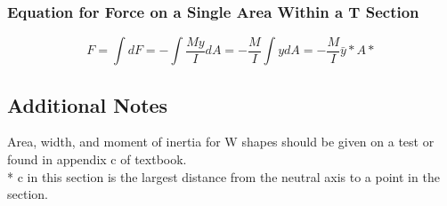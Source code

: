 \documentclass[10pt,landscape]{article}
\newenvironment{Figure}
     {\par\medskip\noindent\minipage{\linewidth}}
     {\endminipage\par\medskip}
\begin{document}
\begin{multicols}{3}
\subsubsection{Equation for Force on a Single Area Within a T Section}
\begin{equation}
    F=\int dF=-\int\frac{My}{I}dA=-\frac{M}{I}\int ydA=-\frac{M}{I}\bar{y}*A*
\end{equation}
\subsection{Additional Notes}
Area, width, and moment of inertia for W shapes should be given on a test or found in appendix c of textbook.\\*
c in this section is the largest distance from the neutral axis to a point in the section.


%
%

\end{multicols}
\end{document}

